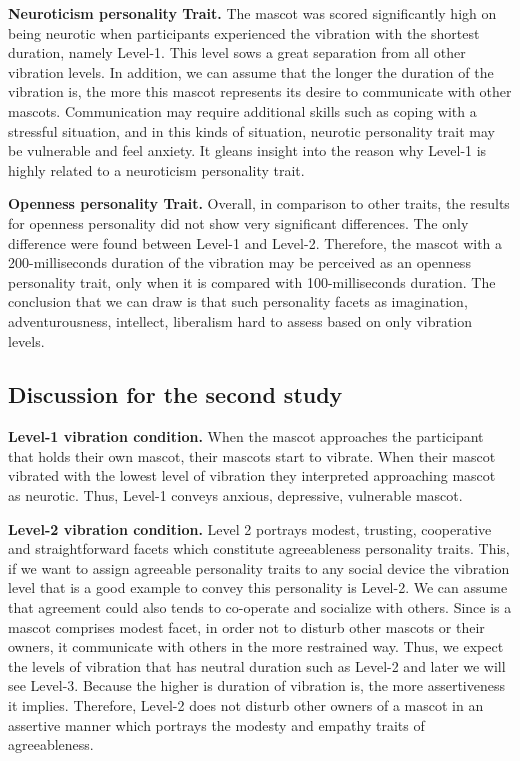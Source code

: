 \par \textbf{Neuroticism personality Trait.}
The mascot was scored significantly high on being neurotic when participants experienced
the vibration with the shortest duration, namely Level-1.
This level sows a great separation from all other vibration levels.
In addition, we can assume that the longer the duration of the vibration is,
the more this mascot represents its desire to communicate with other mascots.
Communication may require additional skills such as coping with a stressful situation,
and in this kinds of situation, neurotic personality trait may be vulnerable and feel anxiety.
It gleans insight into the reason why Level-1 is highly related to a neuroticism personality trait.

\par\textbf{Openness personality Trait.}
Overall, in comparison to other traits, the results for openness personality did not show very significant differences.
The only difference were found between Level-1 and Level-2.
Therefore, the mascot with a 200-milliseconds duration of the vibration
may be perceived as an openness personality trait, only when it is compared with 100-milliseconds duration.
The conclusion that we can draw is that such personality facets as imagination, adventurousness,
intellect, liberalism hard to assess based on only vibration levels.

\subsection{Discussion for the second study}
\label{subsec:discussion-for-the-second-study3}

\par\textbf{Level-1 vibration condition.}
When the mascot approaches the participant that holds their own mascot, their mascots start to vibrate.
When their mascot vibrated with the lowest level of vibration they interpreted approaching mascot as neurotic.
Thus, Level-1 conveys anxious, depressive, vulnerable mascot.

\par\textbf{Level-2 vibration condition.}
Level 2 portrays modest, trusting, cooperative and straightforward facets which constitute
agreeableness personality traits.
This, if we want to assign agreeable personality traits to any social device the vibration
level that is a good example to convey this personality is Level-2.
We can assume that agreement could also tends to co-operate and socialize with others.
Since is a mascot comprises modest facet, in order not to disturb other mascots or their owners,
it communicate with others in the more restrained way.
Thus, we expect the levels of vibration that has neutral duration such as Level-2 and later we will see Level-3.
Because the higher is duration of vibration is, the more assertiveness it implies.
Therefore, Level-2 does not disturb other owners of a mascot in an assertive manner
which portrays the modesty and empathy traits of agreeableness.

